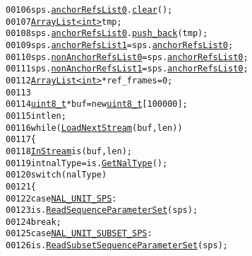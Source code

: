 \begin{footnotesize}
\begin{alltt}
00106                 sps.\hyperlink{struct_sequence_parameters_set_ae9b6a7d85da9fec255cca59c3d750ecd}{anchorRefsList0}.\hyperlink{class_array_list_acb53d54675318c94332d0ec8b6819eb3}{clear}();
00107                 \hyperlink{class_array_list}{ArrayList<int>} tmp;
00108                 sps.\hyperlink{struct_sequence_parameters_set_ae9b6a7d85da9fec255cca59c3d750ecd}{anchorRefsList0}.\hyperlink{class_array_list_a7b5376678a9b5af0e0ed913fbe04b902}{push_back}(tmp);
00109                 sps.\hyperlink{struct_sequence_parameters_set_a7b865f89c34428785081c3c4acadc965}{anchorRefsList1} = sps.\hyperlink{struct_sequence_parameters_set_ae9b6a7d85da9fec255cca59c3d750ecd}{anchorRefsList0};
00110                 sps.\hyperlink{struct_sequence_parameters_set_ab9b078b23e746ef60f7697896b963b93}{nonAnchorRefsList0} = sps.\hyperlink{struct_sequence_parameters_set_ae9b6a7d85da9fec255cca59c3d750ecd}{anchorRefsList0};
00111                 sps.\hyperlink{struct_sequence_parameters_set_a68b7ffb23b151c53312798f7ab79a67a}{nonAnchorRefsList1} = sps.\hyperlink{struct_sequence_parameters_set_ae9b6a7d85da9fec255cca59c3d750ecd}{anchorRefsList0};
00112                 \hyperlink{class_array_list}{ArrayList<int>} *ref\_frames = 0;
00113 
00114                 \hyperlink{_types_8h_a363e4d606232036a6b89060813c45489}{uint8_t} *buf = \textcolor{keyword}{new} \hyperlink{_types_8h_a363e4d606232036a6b89060813c45489}{uint8_t}[100000];
00115                 \textcolor{keywordtype}{int} len;
00116                 \textcolor{keywordflow}{while} (\hyperlink{class_bitstream_data_a9475d45cccc6018ece6dec99caad1e58}{LoadNextStream}(buf, len))
00117                 \{
00118                         \hyperlink{class_in_stream}{InStream} is(buf, len);
00119                         \textcolor{keywordtype}{int} nalType = is.\hyperlink{class_in_stream_a95ef1b146ee1d6ab6152001fc7719478}{GetNalType}();
00120                         \textcolor{keywordflow}{switch} (nalType)
00121                         \{
00122                         \textcolor{keywordflow}{case} \hyperlink{_consts4_standard_8h_a0ae628337fb17a2b11855dd3524f3d04a87cac3a362213e69d6c5b959471f6f98}{NAL_UNIT_SPS}:
00123                                 is.\hyperlink{class_in_stream_abaa60d112267ece8de9f303623abd79d}{ReadSequenceParameterSet}(sps);
00124                                 \textcolor{keywordflow}{break};
00125                         \textcolor{keywordflow}{case} \hyperlink{_consts4_standard_8h_a0ae628337fb17a2b11855dd3524f3d04ac483bd065332f7337e31c959e7034e6f}{NAL_UNIT_SUBSET_SPS}:
00126                                 is.\hyperlink{class_in_stream_abb8e8d2b7eef014e7b6285e130a19a0a}{ReadSubsetSequenceParameterSet}(sps);

\end{alltt}
\end{footnotesize}
